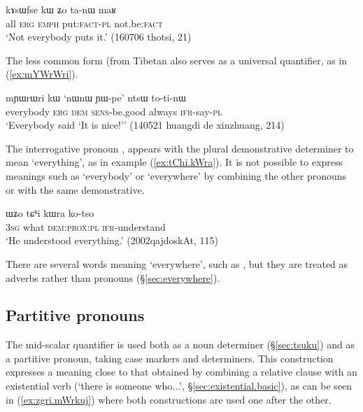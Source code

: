 \begin{exe}
\ex \label{ex:kAsWfse.kW}
\gll kɤsɯfse kɯ ʑo ta-nɯ maʁ \\
all \textsc{erg} \textsc{emph} put:\textsc{fact}-\textsc{pl} not.be:\textsc{fact} \\
\glt `Not everybody puts it.' (160706 thotsi, 21)
\end{exe}

The less common form  (from Tibetan  also serves as a universal quantifier, as in (\ref{ex:mYWrWri}).

\begin{exe}
\ex \label{ex:mYWrWri}
\gll mɲɯrɯri kɯ `nɯnɯ ɲɯ-pe' ntsɯ to-ti-nɯ \\
everybody \textsc{erg} \textsc{dem} \textsc{sens}-be.good always \textsc{ifr}-say-\textsc{pl} \\
\glt `Everybody said `It is nice!'' (140521 huangdi de xinzhuang, 214)
\end{exe}

The interrogative pronoun , appears with the plural demonstrative determiner  to mean `everything', as in example (\ref{ex:tChi.kWra}). It is not possible to express meanings such as `everybody' or `everywhere'  by combining the other pronouns  or  with the same demonstrative.

\begin{exe}
\ex \label{ex:tChi.kWra}
\gll ɯʑo tɕʰi kɯra ko-tso \\
\textsc{3sg} what \textsc{dem}:\textsc{prox:pl} \textsc{ifr}-understand \\
\glt `He understood everything.' (2002qajdoskAt, 115)
\end{exe}

There are several words meaning `everywhere', such as , but they are treated as adverbs rather than pronouns (§\ref{sec:everywhere}).

\subsection{Partitive pronouns} \label{sec:partitive.pronouns}
The mid-scalar quantifier  is used both as a noun determiner (§\ref{sec:tsuku}) and as a partitive pronoun, taking case markers and determiners. This construction expresses a meaning close to that obtained by combining a relative clause with an existential verb (`there is someone who...', §\ref{sec:existential.basic}), as can be seen in (\ref{ex:zgri.mWrkuj}) where both constructions are used one after the other. 

